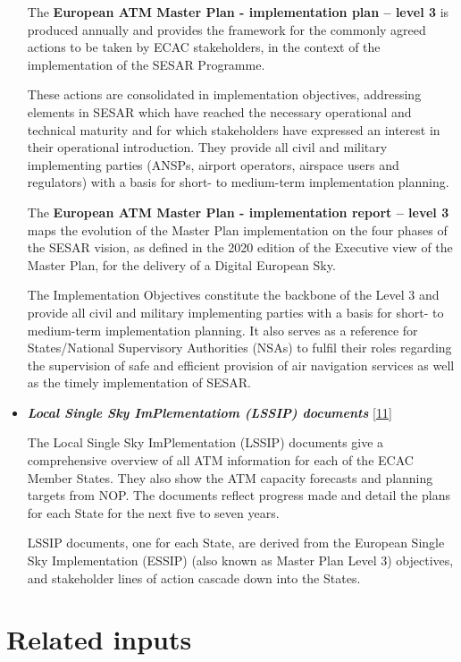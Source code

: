 \documentclass[
  11pt,
  a4paper,
]{book}
\begin{document}
\begin{itemize}
  The \textbf{European ATM Master Plan - implementation plan -- level 3}
  is produced annually and provides the framework for the commonly
  agreed actions to be taken by ECAC stakeholders, in the context of the
  implementation of the SESAR Programme.

  These actions are consolidated in implementation objectives,
  addressing elements in SESAR which have reached the necessary
  operational and technical maturity and for which stakeholders have
  expressed an interest in their operational introduction. They provide
  all civil and military implementing parties (ANSPs, airport operators,
  airspace users and regulators) with a basis for short- to medium-term
  implementation planning.

  The \textbf{European ATM Master Plan - implementation report -- level
  3} maps the evolution of the Master Plan implementation on the four
  phases of the SESAR vision, as defined in the 2020 edition of the
  Executive view of the Master Plan, for the delivery of a Digital
  European Sky.

  The Implementation Objectives constitute the backbone of the Level 3
  and provide all civil and military implementing parties with a basis
  for short- to medium-term implementation planning. It also serves as a
  reference for States/National Supervisory Authorities (NSAs) to fulfil
  their roles regarding the supervision of safe and efficient provision
  of air navigation services as well as the timely implementation of
  SESAR.
\item
  \textbf{\emph{Local Single Sky ImPlementatiom (LSSIP) documents}}
  \protect\hyperlink{ref-ectrl:lssip}{{[}11{]}}

  The Local Single Sky ImPlementation (LSSIP) documents give a
  comprehensive overview of all ATM information for each of the ECAC
  Member States. They also show the ATM capacity forecasts and planning
  targets from NOP. The documents reflect progress made and detail the
  plans for each State for the next five to seven years.

  LSSIP documents, one for each State, are derived from the European
  Single Sky Implementation (ESSIP) (also known as Master Plan Level 3)
  objectives, and stakeholder lines of action cascade down into the
  States.
\end{itemize}

\hypertarget{related-inputs-1}{%
\section{Related inputs}\label{related-inputs-1}}
\end{document}
